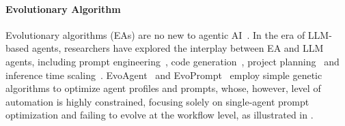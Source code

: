 \paragraph{Evolutionary Algorithm}
Evolutionary algorithms (EAs) are no new to agentic AI~\citep{cetnarowicz1996application,li2016multi,liu2020mapper}. In the era of LLM-based agents, researchers have explored the interplay between EA and LLM agents, including prompt engineering~\citep{xu2022gps,shi2024red}, code generation~\citep{romera2024mathematical}, project planning~\citep{tao2023program} and inference time scaling~\citep{lee2025evolving-deepmind}. EvoAgent~\citep{yuan2024evoagent} and EvoPrompt~\citep{guo2023evoprompt} employ simple genetic algorithms to optimize agent profiles and prompts, whose, however, level of automation is highly constrained, focusing solely on single-agent prompt optimization and failing to evolve at the workflow level, as illustrated in .

                                                                
\vspace{-0.9em}